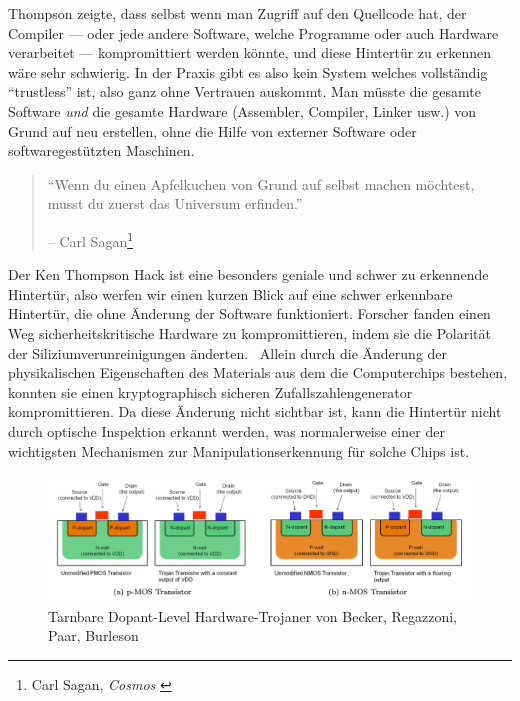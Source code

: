 Thompson zeigte, dass selbst wenn man Zugriff auf den Quellcode hat, der
Compiler --- oder jede andere Software, welche Programme oder auch Hardware
verarbeitet --- kompromittiert werden könnte, und diese Hintertür zu erkennen
wäre sehr schwierig. In der Praxis gibt es also kein System welches vollständig
\enquote{trustless} ist, also ganz ohne Vertrauen auskommt. Man müsste die
gesamte Software \textit{und} die gesamte Hardware (Assembler, Compiler, Linker
usw.) von Grund auf neu erstellen, ohne die Hilfe von externer Software oder
softwaregestützten Maschinen.

\begin{quotation}\begin{samepage}
\enquote{Wenn du einen Apfelkuchen von Grund auf selbst machen möchtest, musst
du zuerst das Universum erfinden.}
\begin{flushright} -- Carl Sagan\footnote{Carl Sagan, \textit{Cosmos} \cite{cosmos}}
\end{flushright}\end{samepage}\end{quotation}

Der Ken Thompson Hack ist eine besonders geniale und schwer zu erkennende
Hintertür, also werfen wir einen kurzen Blick auf eine schwer erkennbare
Hintertür, die ohne Änderung der Software funktioniert. Forscher fanden einen
Weg sicherheitskritische Hardware zu kompromittieren, indem sie die Polarität
der Siliziumverunreinigungen änderten.~\cite{becker2013stealthy}  Allein durch
die Änderung der physikalischen Eigenschaften des Materials aus dem die
Computerchips bestehen, konnten sie einen kryptographisch sicheren
Zufallszahlengenerator kompromittieren. Da diese Änderung nicht sichtbar ist,
kann die Hintertür nicht durch optische Inspektion erkannt werden, was
normalerweise einer der wichtigsten Mechanismen zur Manipulationserkennung für
solche Chips ist.

\begin{figure}
  \includegraphics{assets/images/stealthy-hardware-trojan.png}
  \caption{Tarnbare Dopant-Level Hardware-Trojaner von Becker, Regazzoni, Paar, Burleson}
  \label{fig:stealthy-hardware-trojan}
\end{figure}

